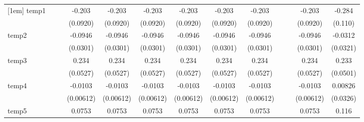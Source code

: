 {\begin{tabular}{l*{12}{c}}
[1em]
temp1       &                     &                     &      -0.203\sym{*}  &      -0.203\sym{*}  &      -0.203\sym{*}  &      -0.203\sym{*}  &      -0.203\sym{*}  &      -0.203\sym{*}  &                     &                     &      -0.203\sym{*}  &      -0.284\sym{*}  \\
            &                     &                     &    (0.0920)         &    (0.0920)         &    (0.0920)         &    (0.0920)         &    (0.0920)         &    (0.0920)         &                     &                     &    (0.0920)         &     (0.110)         \\
[1em]
temp2       &                     &                     &     -0.0946\sym{**} &     -0.0946\sym{**} &     -0.0946\sym{**} &     -0.0946\sym{**} &     -0.0946\sym{**} &     -0.0946\sym{**} &                     &                     &     -0.0946\sym{**} &     -0.0312         \\
            &                     &                     &    (0.0301)         &    (0.0301)         &    (0.0301)         &    (0.0301)         &    (0.0301)         &    (0.0301)         &                     &                     &    (0.0301)         &    (0.0321)         \\
[1em]
temp3       &                     &                     &       0.234\sym{**} &       0.234\sym{**} &       0.234\sym{**} &       0.234\sym{**} &       0.234\sym{**} &       0.234\sym{**} &                     &                     &       0.234\sym{**} &       0.233\sym{***}\\
            &                     &                     &    (0.0527)         &    (0.0527)         &    (0.0527)         &    (0.0527)         &    (0.0527)         &    (0.0527)         &                     &                     &    (0.0527)         &    (0.0501)         \\
[1em]
temp4       &                     &                     &     -0.0103         &     -0.0103         &     -0.0103         &     -0.0103         &     -0.0103         &     -0.0103         &                     &                     &     -0.0103         &     0.00826         \\
            &                     &                     &   (0.00612)         &   (0.00612)         &   (0.00612)         &   (0.00612)         &   (0.00612)         &   (0.00612)         &                     &                     &   (0.00612)         &    (0.0326)         \\
[1em]
temp5       &                     &                     &      0.0753\sym{*}  &      0.0753\sym{*}  &      0.0753\sym{*}  &      0.0753\sym{*}  &      0.0753\sym{*}  &      0.0753\sym{*}  &                     &                     &      0.0753\sym{*}  &       0.116         \\

\end{tabular}}
